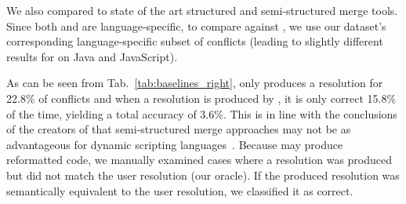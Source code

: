 \begin{table}[htb]
\small
\caption{Comparison of \thistool{} to \jdime{} and \jsfstmerge{} semi-structured merge tools. The table shows the percentage of conflicts in which the tool produces a resolution, the top-1 precision of produced resolutions, and the overall top-1 accuracy of merge resolution synthesis. \jdime{} evaluation is on a Java data set and \jsfstmerge{} is on a JavaScript data set.}
\vspace{-4pt}
\centering
{}
\label{tab:baselines_right}
\vspace{-6pt}
\end{table}

We also compared \thistool{} to state of the art structured and semi-structured merge tools.  Since both \jdime{} and \jsfstmerge{} are language-specific, to compare against \thistool{}, we use our dataset's corresponding language-specific subset of conflicts (leading to slightly different results for \thistool{} on Java and JavaScript).

As can be seen from Tab.~\ref{tab:baselines_right}, \jsfstmerge{} only produces a resolution for 22.8\% of conflicts and when a resolution is produced by \jsfstmerge{}, it is only correct 15.8\% of the time, yielding a total accuracy of 3.6\%. 
This is in line with the conclusions of the creators of \jsfstmerge{} that semi-structured merge approaches may not be as advantageous for dynamic scripting languages~\citep{tavares2019javascript}. Because \jsfstmerge{} may produce reformatted code, we manually examined cases where a resolution was produced but did not match the user resolution (our oracle).  If the produced resolution was semantically equivalent to the user resolution, we classified it as correct.


